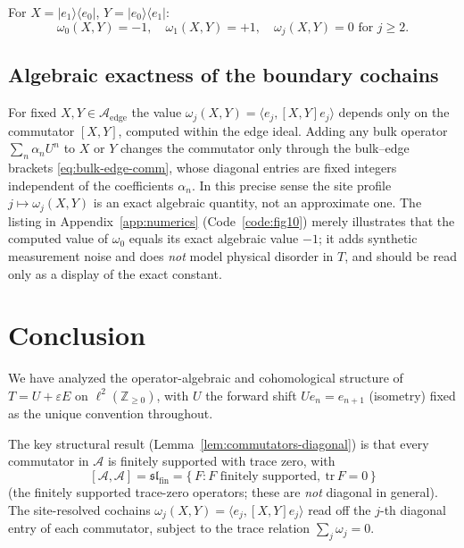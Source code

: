\documentclass[10pt]{amsart}
\newcommand{\1}{{\mathbb{I}}}
\numberwithin{equation}{section}
\begin{document}
For $X = |e_1\rangle\langle e_0|$, $Y = |e_0\rangle\langle e_1|$:
\[
\omega_0(X,Y) = -1, \quad \omega_1(X,Y) = +1, \quad \omega_j(X,Y) = 0 \text{ for } j \ge 2.
\]

\subsection{Algebraic exactness of the boundary cochains}

For fixed $X,Y \in \mathcal{A}_{\mathrm{edge}}$ the value $\omega_j(X,Y)=\langle e_j,[X,Y]e_j\rangle$
depends only on the commutator $[X,Y]$, computed within the edge ideal. Adding any bulk operator
$\sum_n\alpha_n U^n$ to $X$ or $Y$ changes the commutator only through the bulk--edge brackets
\eqref{eq:bulk-edge-comm}, whose diagonal entries are fixed integers independent of the
coefficients $\alpha_n$. In this precise sense the site profile $j\mapsto\omega_j(X,Y)$ is an
exact algebraic quantity, not an approximate one. The listing in Appendix~\ref{app:numerics}
(Code~\ref{code:fig10}) merely illustrates that the computed value of $\omega_0$ equals its exact
algebraic value $-1$; it adds synthetic measurement noise and does \emph{not} model physical
disorder in $T$, and should be read only as a display of the exact constant.

\section{Conclusion}
\label{sec:conclusion}

We have analyzed the operator-algebraic and cohomological structure of
$T = U + \varepsilon E$ on $\ell^2(\mathbb{Z}_{\ge 0})$, with $U$ the forward shift
$Ue_n = e_{n+1}$ (isometry) fixed as the unique convention throughout.

The key structural result (Lemma~\ref{lem:commutators-diagonal}) is that every commutator in
$\mathcal{A}$ is finitely supported with trace zero, with
\[
[\mathcal{A},\mathcal{A}] = \mathfrak{sl}_{\mathrm{fin}}
= \{\,F : F \text{ finitely supported},\ \mathrm{tr}\,F = 0\,\}
\]
(the finitely supported trace-zero operators; these are \emph{not} diagonal in general).
The site-resolved cochains $\omega_j(X,Y) = \langle e_j,[X,Y]e_j\rangle$ read off the $j$-th
diagonal entry of each commutator, subject to the trace relation $\sum_j\omega_j=0$.
\end{document}
